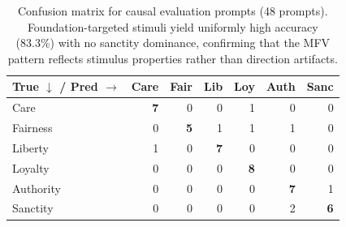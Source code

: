 \begin{table}[h]
\centering
\small
\begin{tabular}{l rrrrrr}
\toprule
True $\downarrow$ / Pred $\rightarrow$ & Care & Fair & Lib & Loy & Auth & Sanc \\
\midrule
Care      & \textbf{7} & 0 & 0 & 1 & 0 & 0 \\
Fairness  & 0 & \textbf{5} & 1 & 1 & 1 & 0 \\
Liberty   & 1 & 0 & \textbf{7} & 0 & 0 & 0 \\
Loyalty   & 0 & 0 & 0 & \textbf{8} & 0 & 0 \\
Authority & 0 & 0 & 0 & 0 & \textbf{7} & 1 \\
Sanctity  & 0 & 0 & 0 & 0 & 2 & \textbf{6} \\
\bottomrule
\end{tabular}
\caption{Confusion matrix for causal evaluation prompts (48 prompts). Foundation-targeted stimuli yield uniformly high accuracy (83.3\%) with no sanctity dominance, confirming that the MFV pattern reflects stimulus properties rather than direction artifacts.}
\label{tab:confusion-causal}
\end{table}
